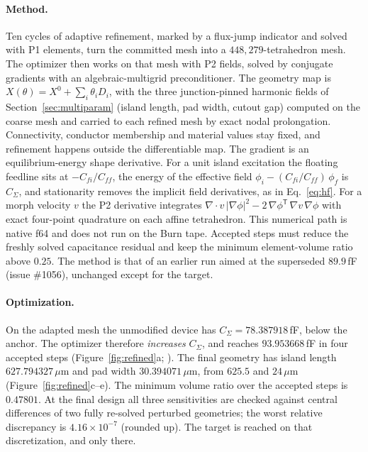 \documentclass{anvil-paper}
\begin{document}
\paragraph{Method.}
Ten cycles of adaptive refinement, marked by a flux-jump indicator and
solved with P1 elements, turn the committed mesh into a
$448{,}279$-tetrahedron mesh. The optimizer then works on that mesh
with P2 fields, solved by conjugate gradients with an
algebraic-multigrid preconditioner. The geometry map is
$X(\theta) = X^0 + \sum_i \theta_i D_i$, with the three junction-pinned
harmonic fields of Section~\ref{sec:multiparam} (island length, pad
width, cutout gap) computed on the coarse mesh and carried to each
refined mesh by exact nodal prolongation. Connectivity, conductor
membership and material values stay fixed, and refinement happens
outside the differentiable map. The gradient is an equilibrium-energy
shape derivative. For a unit island excitation the floating feedline
sits at $-C_{fi}/C_{ff}$, the energy of the effective field
$\phi_i - (C_{fi}/C_{ff})\,\phi_f$ is $C_\Sigma$, and stationarity
removes the implicit field derivatives, as in Eq.~\eqref{eq:hf}. For a
morph velocity $v$ the P2 derivative integrates
$\nabla\!\cdot v\,\lvert\nabla\phi\rvert^2
 - 2\,\nabla\phi^{\mathsf T}\,\nabla v\,\nabla\phi$
with exact four-point quadrature on each affine tetrahedron. This numerical path is native f64 and does not run
on the Burn tape. Accepted steps must reduce the freshly solved
capacitance residual and keep the minimum element-volume ratio above
$0.25$. The method is that of an earlier run aimed at the superseded
$89.9$\,fF (issue \#1056), unchanged except for the target.

\paragraph{Optimization.}
On the adapted mesh the unmodified device has $C_\Sigma =
78.387918$\,fF, below the anchor. The optimizer therefore
\emph{increases} $C_\Sigma$, and reaches $93.953668$\,fF in four
accepted steps (Figure~\ref{fig:refined}a;
).
The final geometry has island length $627.794327\,\mu$m and pad width
$30.394071\,\mu$m, from $625.5$ and $24\,\mu$m
(Figure~\ref{fig:refined}c--e). The minimum
volume ratio over the accepted steps is $0.47801$. At the final design
all three sensitivities are checked against central differences of two
fully re-solved perturbed geometries; the worst relative discrepancy is
$4.16\times10^{-7}$ (rounded up). The target is reached on that
discretization, and only there.
\end{document}
